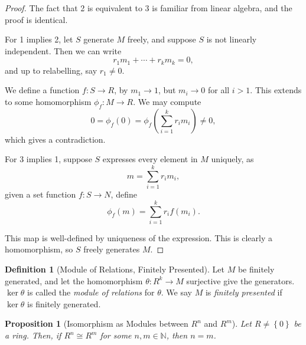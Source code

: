 \documentclass{article}
\newtheorem{proposition}[theorem]{Proposition}
\theoremstyle{definition}
\newtheorem{definition}[theorem]{Definition}
\theoremstyle{remark}
\newcommand{\pqty}[1]{\left(#1\right)}
\newcommand{\Bqty}[1]{\left\{#1\right\}}
\newcommand{\functiondomain}[3]{#1:#2\to #3}
\newcommand{\isomorphic}{\cong}
\newcommand{\NN}{\mathbb{N}}
\begin{document}
\begin{proof}
    The fact that 2 is equivalent to 3 is familiar from linear algebra, and the proof is identical.

    For 1 implies 2, let \(S\) generate \(M\) freely, and suppose \(S\) is not linearly independent. Then we can write
    \[
        r_1 m_1 + \cdots + r_k m_k = 0,
    \]
    and up to relabelling, say \(r_1 \neq 0\).

    We define a function \(\functiondomain{f}{S}{R}\), by \(m_1 \to 1\), but \(m_i \to 0\) for all \(i > 1\). This extends to some homomorphism \(\functiondomain{\phi_f}{M}{R}\). We may compute
    \[
        0 = \phi_f\pqty{0} = \phi_f \pqty{\sum_{i = 1}^{k} r_i m_i} \neq 0,
    \]
    which gives a contradiction.

    For 3 implies 1, suppose \(S\) expresses every element in \(M\) uniquely, as
    \[
        m = \sum_{i = 1}^{k} r_i m_i,
    \]
    given a set function \(\functiondomain{f}{S}{N}\), define
    \[
        \phi_f\pqty{m} = \sum_{i = 1}^{k} r_i f\pqty{m_i}.
    \]

    This map is well-defined by uniqueness of the expression. This is clearly a homomorphism, so \(S\) freely generates \(M\).
\end{proof}

\begin{definition}[Module of Relations, Finitely Presented]
    \label{def:module-of-relations-finitely-presented}%
    Let \(M\) be finitely generated, and let the homomorphism \(\functiondomain{\theta}{R^k}{M}\) surjective give the generators. \(\ker \theta\) is called the \emph{module of relations} for \(\theta\). We say \(M\) is \emph{finitely presented} if \(\ker \theta\) is finitely generated.
\end{definition}

\begin{proposition}[Isomorphism as Modules between \(R^n\) and \(R^m\)]
    \label{prop:isomorphism-modules-rn-rm}%
    Let \(R \neq \Bqty{0}\) be a ring. Then, if \(R^n \isomorphic R^m\) for some \(n, m \in \NN\), then \(n = m\).
\end{proposition}
\end{document}
